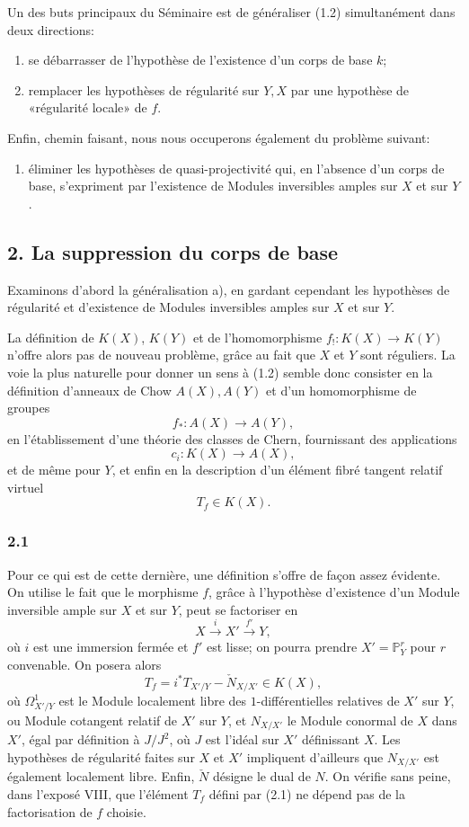 \documentclass[11pt]{article}
\begin{document}
Un des buts principaux du Séminaire est de généraliser (1.2) simultanément dans deux directions:
\begin{enumerate}[label=\alph*)]
\item se débarrasser de l'hypothèse de l'existence d'un corps de base $k$;
\item remplacer les hypothèses de régularité sur $Y,X$ par une hypothèse de «régularité locale» de $f$.
\end{enumerate}
Enfin, chemin faisant, nous nous occuperons également du problème suivant:
\begin{enumerate}[label=\alph*),start=3]
\item éliminer les hypothèses de quasi-projectivité qui, en l'absence d'un corps de base, s'expriment par l'existence de Modules inversibles amples sur $X$ et sur $Y$.
\end{enumerate}

\subsection*{2. La suppression du corps de base}
Examinons d'abord la généralisation a), en gardant cependant les hypothèses de régularité et d'existence de Modules inversibles amples sur $X$ et sur $Y$.

La définition de $K(X)$, $K(Y)$ et de l'homomorphisme $f_!:K(X)\to K(Y)$ n'offre alors pas de nouveau problème, grâce au fait que $X$ et $Y$ sont réguliers. La voie la plus naturelle pour donner un sens à (1.2) semble donc consister en la définition d'anneaux de Chow $A(X),A(Y)$ et d'un homomorphisme de groupes
\[
f_*:A(X)\longrightarrow A(Y),
\]
en l'établissement d'une théorie des classes de Chern, fournissant des applications
\[
c_i:K(X)\longrightarrow A(X),
\]
et de même pour $Y$, et enfin en la description d'un élément fibré tangent relatif virtuel
\[
T_f\in K(X).
\]

\subsubsection*{2.1}
Pour ce qui est de cette dernière, une définition s'offre de façon assez évidente. On utilise le fait que le morphisme $f$, grâce à l'hypothèse d'existence d'un Module inversible ample sur $X$ et sur $Y$, peut se factoriser en
\[
X\xrightarrow{i}X'\xrightarrow{f'}Y,
\]
où $i$ est une immersion fermée et $f'$ est lisse; on pourra prendre $X'=\mathbb P^r_Y$ pour $r$ convenable. On posera alors
\begin{equation}\tag{2.1}
T_f=i^*T_{X'/Y}-\check N_{X/X'}\in K(X),
\end{equation}
où $\Omega^1_{X'/Y}$ est le Module localement libre des $1$-différentielles relatives de $X'$ sur $Y$, ou Module cotangent relatif de $X'$ sur $Y$, et $N_{X/X'}$ le Module conormal de $X$ dans $X'$, égal par définition à $J/J^2$, où $J$ est l'idéal sur $X'$ définissant $X$. Les hypothèses de régularité faites sur $X$ et $X'$ impliquent d'ailleurs que $N_{X/X'}$ est également localement libre. Enfin, $\check N$ désigne le dual de $N$. On vérifie sans peine, dans l'exposé VIII, que l'élément $T_f$ défini par (2.1) ne dépend pas de la factorisation de $f$ choisie.
\end{document}
